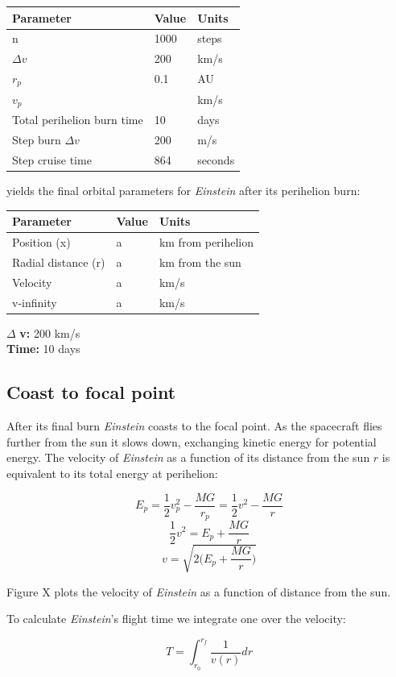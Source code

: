 \documentclass[12pt]{article} %
\begin{document}
\begin{center}
\begin{tabular}{|m{5 cm}| m{5 cm}| m{5 cm}|} \hline
\textbf{Parameter} & \textbf{Value} & \textbf{Units}\\ \hline
n & 1000& steps\\ \hline
$\Delta v$ & 200& km/s \\ \hline
$r_p$      &  0.1& AU\\ \hline
$v_p$     &  & km/s\\ \hline
Total perihelion burn time & 10 & days \\ \hline
Step burn $\Delta v$ & 200 & m/s\\ \hline
Step cruise time & 864& seconds \\ \hline
\end{tabular}
\end{center}

yields the final orbital parameters for \textit{Einstein} after its perihelion burn:

\begin{center}
\begin{tabular}{|m{5 cm}| m{5 cm}| m{5 cm}|} \hline
\textbf{Parameter} & \textbf{Value} & \textbf{Units}\\ \hline
Position (x) & a& km from perihelion\\ \hline
Radial distance (r) & a& km from the sun\\ \hline
Velocity      &  a& km/s\\ \hline
v-infinity     &  a& km/s\\ \hline
\end{tabular}
\end{center}


$\Delta$ \textbf{v:} 200 km/s\\
\textbf{Time:} 10 days\\

\subsection{Coast to focal point}
After its final burn \textit{Einstein} coasts to the focal point. As the spacecraft flies further from the sun it slows down, exchanging kinetic energy for potential energy. The velocity of \textit{Einstein} as a function of its distance from the sun $r$ is equivalent to its total energy at perihelion:

$$E_{p} = \frac{1}{2}v_p^2 - \frac{MG}{r_p} = \frac{1}{2}v^2-\frac{MG}{r}$$
$$\frac{1}{2}v^2 = E_p+\frac{MG}{r}$$
$$v = \sqrt{2\big(E_p + \frac{MG}{r}\big)}$$

Figure X plots the velocity of \textit{Einstein} as a function of distance from the sun.

To calculate \textit{Einstein}'s flight time we integrate one over the velocity:

$$T = \int_{r_0}^{r_f} \frac{1}{v(r)} dr$$
\end{document}
